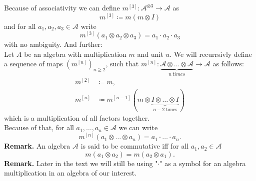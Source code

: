 \documentclass[a4paper, 12pt]{article}
\begin{document}
\indent  Because of associativity we can define $m^{[3]} : \mathcal{A}^{\otimes 3} \to \mathcal{A}$ as
\begin{equation*}
m^{[3]} \coloneqq m(m\otimes I)
\end{equation*}
and for all $a_1, a_2, a_3 \in \mathcal{A}$ write
\begin{equation*}
m^{[3]}(a_1 \otimes a_2 \otimes a_3) = a_1 \cdot a_2 \cdot a_3
\end{equation*}
with no ambiguity.
And further: \\
\indent Let $A$ be an algebra with multiplication $m$ and unit $u$. We will recurrsivly define a
sequence of maps
$(m^{[n]})_{n \geq 2}$, such that $m^{[n]} : \underbrace{\mathcal{A} \otimes \dots \otimes
\mathcal{A} }_{n\ times} \to \mathcal{A} $
as follows:
\begin{align*}
m^{[2]} &\coloneqq m, \\
m^{[n]} &\coloneqq m^{[n-1]}(m \otimes \underbrace{I \otimes \dots \otimes I}_{n-2 \mathrm{\ times}})
\end{align*}
which is a multiplication of all factors together. \\
Because of that, for all $a_1, \dots, a_n \in \mathcal{A} $ we can write
\begin{equation*}
m^{[n]}(a_1 \otimes \dots \otimes a_n) = a_1 \cdot \ldots \cdot a_n.
\end{equation*}
\textbf{Remark. } An algebra $\mathcal{A} $ is said to be commutative iff for all $a_1, a_2 \in \mathcal{A}$
\begin{equation*}
m(a_1 \otimes a_2 ) = m(a_2 \otimes a_1).
\end{equation*}
\indent \textbf{Remark. } Later in the text we will still be using "$\cdot$" as a symbol for an algebra
multiplication in an algebra of our interest.
\end{document}

